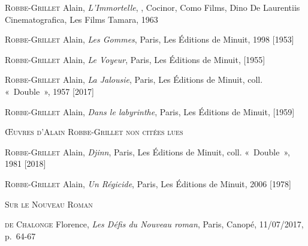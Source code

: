 \documentclass[12pt, a4paper]{article}
\begin{document}
		
	
		\textsc{Robbe-Grillet} Alain, \textit{L'Immortelle}, , Cocinor, Como Films, Dino De Laurentiis Cinematografica, Les Films Tamara, 1963\par 
		 
		
	
		\textsc{Robbe-Grillet} Alain, \textit{Les Gommes}, Paris, Les Éditions de Minuit, 1998 [1953]\par 
		 
		
	
		\textsc{Robbe-Grillet} Alain, \textit{Le Voyeur}, Paris, Les Éditions de Minuit,  [1955]\par 
		 
		
	
		\textsc{Robbe-Grillet} Alain, \textit{La Jalousie}, Paris, Les Éditions de Minuit, coll. «~Double~», 1957 [2017]\par 
		 
		
	
		\textsc{Robbe-Grillet} Alain, \textit{Dans le labyrinthe}, Paris, Les Éditions de Minuit,  [1959]\par 
		 
		
	
		\vspace*{2cm}
		\setlength{\parindent}{0cm}
{\large\textsc{Œuvres d'Alain Robbe-Grillet non citées lues}}
		\vspace*{1cm}
		\setlength{\parindent}{25pt}
		
		
		
		
		\textsc{Robbe-Grillet} Alain, \textit{Djinn}, Paris, Les Éditions de Minuit, coll. «~Double~», 1981 [2018]\par 
		 
		
	
		\textsc{Robbe-Grillet} Alain, \textit{Un Régicide}, Paris, Les Éditions de Minuit, 2006 [1978]\par 
		 
		
	
		\vspace*{2cm}
		\setlength{\parindent}{0cm}
{\large\textsc{Sur le Nouveau Roman}}
		\vspace*{1cm}
		\setlength{\parindent}{25pt}
		
		
		
		
		\textsc{de Chalonge} Florence, \textit{Les Défis du Nouveau roman}, Paris, Canopé, 11/07/2017, p.~64-67\par
		
		
		
		
	
\end{document}
